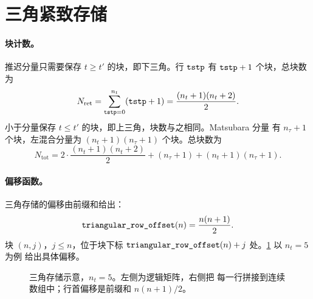 \section{三角紧致存储}
\label{sec:packed}

\paragraph{块计数。}
推迟分量只需要保存 $t\ge t'$ 的块，即下三角。行 $\texttt{tstp}$ 有 $\texttt{tstp}+1$
个块，总块数为
\begin{equation}
    N_{\mathrm{ret}} = \sum^{n_t}_{\texttt{tstp}=0}(\texttt{tstp}+1)
    = \frac{(n_t+1)(n_t+2)}{2}.
    \label{eq:ret-blocks}
\end{equation}
小于分量保存 $t\le t'$ 的块，即上三角，块数与之相同。Matsubara 分量
有 $n_\tau+1$ 个块，左混合分量为 $(n_t+1)(n_\tau+1)$ 个块。总块数为
\begin{equation}
    N_{\mathrm{tot}}
    = 2\cdot\frac{(n_t+1)(n_t+2)}{2}
      + (n_\tau+1) + (n_t+1)(n_\tau+1).
    \label{eq:total-blocks}
\end{equation}

\paragraph{偏移函数。}
三角存储的偏移由前缀和给出：
\begin{equation}
    \code{triangular_row_offset}(n) = \frac{n(n+1)}{2}.
    \label{eq:tri-off}
\end{equation}
块 $(n,j)$，$j\le n$，位于块下标
$\code{triangular_row_offset}(n)+j$ 处。\cref{fig:tri-storage} 以 $n_t=5$ 为例
给出具体偏移。



\begin{figure}[htbp]
    \centering
    \caption[三角存储示意]{三角存储示意，$n_t=5$。左侧为逻辑矩阵，右侧把
             每一行拼接到连续数组中；行首偏移是前缀和 $n(n+1)/2$。}
    \label{fig:tri-storage}
\end{figure}


